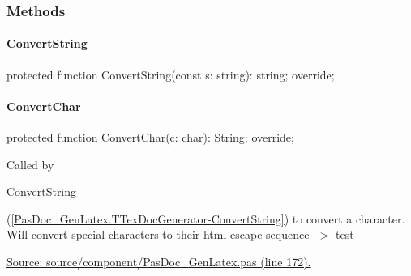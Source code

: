 \documentclass{report}
\newif\ifpdf
\begin{document}
\subsubsection*{\large{\textbf{Methods}}\normalsize\hspace{1ex}\hfill}
\paragraph*{ConvertString}\hspace*{\fill}

\label{PasDoc_GenLatex.TTexDocGenerator-ConvertString}
\begin{list}{}{
\setlength{\itemindent}{0cm}
\setlength{\listparindent}{0cm}
\setlength{\leftmargin}{\evensidemargin}
\addtolength{\leftmargin}{\tmplength}
\settowidth{\labelsep}{X}
\addtolength{\leftmargin}{\labelsep}
\setlength{\labelwidth}{\tmplength}
}
\item[\textbf{Declaration}\hfill]
\ifpdf
\begin{flushleft}
\fi
\begin{ttfamily}
protected function ConvertString(const s: string): string; override;\end{ttfamily}

\ifpdf
\end{flushleft}
\fi

\end{list}
\paragraph*{ConvertChar}\hspace*{\fill}

\label{PasDoc_GenLatex.TTexDocGenerator-ConvertChar}
\begin{list}{}{
\setlength{\itemindent}{0cm}
\setlength{\listparindent}{0cm}
\setlength{\leftmargin}{\evensidemargin}
\addtolength{\leftmargin}{\tmplength}
\settowidth{\labelsep}{X}
\addtolength{\leftmargin}{\labelsep}
\setlength{\labelwidth}{\tmplength}
}
\item[\textbf{Declaration}\hfill]
\ifpdf
\begin{flushleft}
\fi
\begin{ttfamily}
protected function ConvertChar(c: char): String; override;\end{ttfamily}

\ifpdf
\end{flushleft}
\fi

\par
\item[\textbf{Description}]
Called by \begin{ttfamily}ConvertString\end{ttfamily}(\ref{PasDoc_GenLatex.TTexDocGenerator-ConvertString}) to convert a character. Will convert special characters to their html escape sequence {-}{$>$} test\par
\href{https://github.com/pasdoc/pasdoc/blob/master/source/component/PasDoc_GenLatex.pas#L172}{Source: source/component/PasDoc{\_}GenLatex.pas (line 172).}

\end{list}
\end{document}
